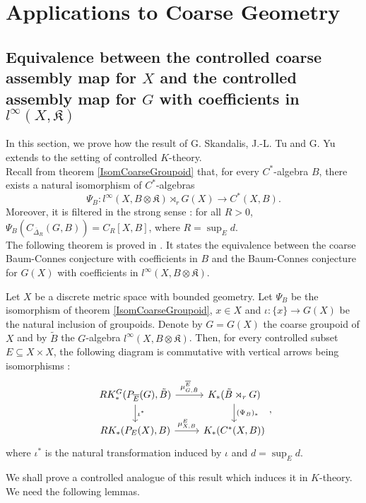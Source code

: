 \section{Applications to Coarse Geometry}

\subsection{Equivalence between the controlled coarse assembly map for $X$ and the controlled assembly map for $G$ with coefficients in $l^\infty(X,\mathfrak K)$}

In this section, we prove how the result of G. Skandalis, J.-L. Tu and G. Yu \cite{SkTuYu} extends to the setting of controlled $K$-theory. \\

Recall from theorem \ref{IsomCoarseGroupoid} that, for every $C^*$-algebra $B$, there exists a natural isomorphism of $C^*$-algebras 
\[\Psi_B : l^\infty(X,B\otimes\mathfrak K)\rtimes_r G(X)\rightarrow C^*(X,B).\]
Moreover, it is filtered in the strong sense : for all $R>0$, $\Psi_B(C_{\overline\Delta_R}(G,B))= C_R[X,B]$, where $R=\sup_E d$.\\

The following theorem is proved in \cite{SkTuYu}. It states the equivalence between the coarse Baum-Connes conjecture with coefficients in $B$ and the Baum-Connes conjecture for $G(X)$ with coefficients in $l^\infty(X,B\otimes\mathfrak K)$.  

\begin{thm}
Let $X$ be a discrete metric space with bounded geometry. Let $\Psi_B$ be the isomorphism of theorem \ref{IsomCoarseGroupoid}, $x\in X$ and $\iota :\{x\}\rightarrow G(X)$ be the natural inclusion of groupoids. Denote by $G=G(X)$ the coarse groupoid of $X$ and by $\tilde B$ the $G$-algebra $l^\infty (X,B\otimes\mathfrak K)$. Then, for every controlled subset $E\subseteq X\times X$, the following diagram is commutative with vertical arrows being isomorphisms :
\[\begin{tikzcd}
RK_*^G(P_{\overline{E}}(G),\tilde B) \arrow{r}{\mu_{G,\tilde B}^{\overline E}}\arrow{d}{\iota^*}& K_*(\tilde B\rtimes_r G)\arrow{d}{(\Psi_B)_*}\\
RK_*(P_E(X),B) \arrow{r}{\mu_{X,B}^E}& K_*(C^*(X,B))
\end{tikzcd},\]
where $\iota^*$ is the natural transformation induced by $\iota$ and $d= \sup_E d$.
\end{thm}

We shall prove a controlled analogue of this result which induces it in $K$-theory. We need the following lemmas. %

